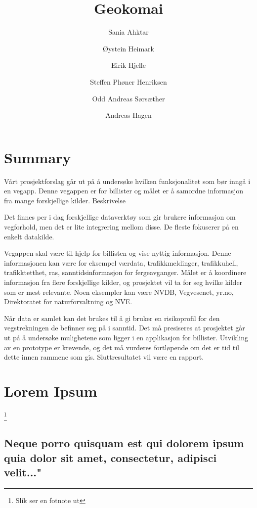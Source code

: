 \documentclass[titlepage,norsk]{article}
\title{Geokomai}
\author{ Sania Ahktar \and Øystein Heimark \and Eirik Hjelle
		\and Steffen Phøner Henriksen \and Odd Andreas Sørsæther \and Andreas Hagen}
\begin{document}
\maketitle


\section{Summary}


Vårt prosjektforslag går ut på å undersøke hvilken funksjonalitet som bør inngå i en vegapp. Denne vegappen er for billister og målet er å samordne informasjon fra mange forskjellige kilder. 
Beskrivelse

Det finnes per i dag forskjellige dataverktøy som gir brukere informasjon om vegforhold, men det er lite integrering mellom disse. De fleste fokuserer på en enkelt datakilde.

Vegappen skal være til hjelp for billisten og vise nyttig informasjon. Denne informasjonen kan være for eksempel værdata, trafikkmeldinger, trafikkuhell, trafikktetthet, ras, sanntidsinformasjon for fergeavganger. Målet er å koordinere informasjon fra flere forskjellige kilder, og prosjektet vil ta for seg hvilke kilder som er mest relevante. Noen eksempler kan være NVDB, Vegvesenet, yr.no, Direktoratet for naturforvaltning og NVE. 

Når data er samlet kan det brukes til å gi bruker en risikoprofil for den vegstrekningen de befinner seg på i sanntid. Det må presiseres at prosjektet går ut på å undersøke mulighetene som ligger i en applikasjon for billister. Utvikling av en prototype er krevende, og det må vurderes fortløpende om det er tid til dette innen rammene som gis. Sluttresultatet vil være en rapport. 

\newpage

\section{Lorem Ipsum}

\footnote{Slik ser en fotnote ut}

\subsection{Neque porro quisquam est qui dolorem ipsum quia dolor sit amet, consectetur, adipisci velit..."}
\end{document}
